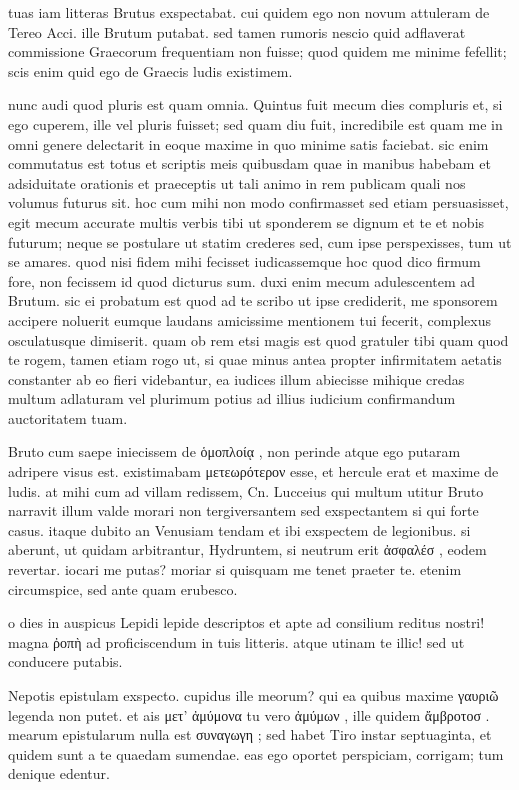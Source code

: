 


 tuas iam litteras Brutus exspectabat. cui quidem ego non novum attuleram de Tereo Acci. ille Brutum putabat. sed tamen rumoris nescio quid adflaverat commissione Graecorum frequentiam non fuisse; quod quidem me minime fefellit; scis enim quid ego de Graecis ludis existimem.

 nunc audi quod pluris est quam omnia. Quintus fuit mecum dies compluris et, si ego cuperem, ille vel pluris fuisset; sed quam diu fuit, incredibile est quam me in omni genere delectarit in eoque maxime in quo minime satis faciebat. sic enim commutatus est totus et scriptis meis quibusdam quae in manibus habebam et adsiduitate orationis et praeceptis ut tali animo in rem publicam quali nos volumus futurus sit. hoc cum mihi non modo confirmasset sed etiam persuasisset, egit mecum accurate multis verbis tibi ut sponderem se dignum et te et nobis futurum; neque se postulare ut statim crederes sed, cum ipse perspexisses, tum ut se amares. quod nisi fidem mihi fecisset iudicassemque hoc quod dico firmum fore, non fecissem id quod dicturus sum. duxi enim mecum adulescentem ad Brutum. sic ei probatum est quod ad te scribo ut ipse crediderit, me sponsorem accipere noluerit eumque laudans amicissime mentionem tui fecerit, complexus osculatusque dimiserit. quam ob rem etsi magis est quod gratuler tibi quam quod te rogem, tamen etiam rogo ut, si quae minus antea propter infirmitatem aetatis constanter ab eo fieri videbantur, ea iudices illum abiecisse mihique credas multum adlaturam vel plurimum potius ad illius iudicium confirmandum auctoritatem tuam.

 Bruto cum saepe iniecissem de ὁμοπλοίᾳ , non perinde atque ego putaram adripere visus est. existimabam μετεωρότερον esse, et hercule erat et maxime de ludis. at mihi cum ad villam redissem, Cn. Lucceius qui multum utitur Bruto narravit illum valde morari non tergiversantem sed exspectantem si qui forte casus. itaque dubito an Venusiam tendam et ibi exspectem de legionibus. si aberunt, ut quidam arbitrantur, Hydruntem, si neutrum erit ἀσφαλέσ , eodem revertar. iocari me putas? moriar si quisquam me tenet praeter te. etenim circumspice, sed ante quam erubesco.

 o dies in auspicus Lepidi lepide descriptos et apte ad consilium reditus nostri! magna ῤοπὴ ad proficiscendum in tuis litteris. atque utinam te illic! sed ut conducere putabis.

 Nepotis epistulam exspecto. cupidus ille meorum? qui ea quibus maxime γαυριῶ legenda non putet. et ais μετ' ἀμύμονα tu vero ἀμύμων , ille quidem ἄμβροτοσ . mearum epistularum nulla est συναγωγη ; sed habet Tiro instar septuaginta, et quidem sunt a te quaedam sumendae. eas ego oportet perspiciam, corrigam; tum denique edentur.
